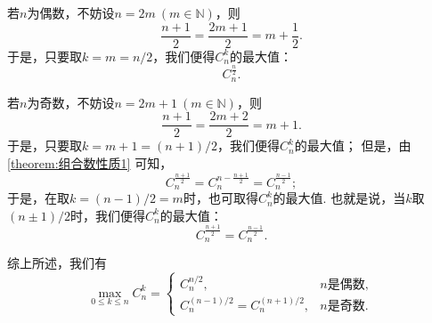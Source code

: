 \begin{example}
\begin{solution}
若\(n\)为偶数，不妨设\(n = 2m\ (m\in\mathbb{N})\)，则\begin{equation*}
	\frac{n+1}{2} = \frac{2m+1}{2}
	= m+\frac{1}{2}.
\end{equation*}
于是，只要取\(k = m = n/2\)，我们便得\(C_n^k\)的最大值：\begin{equation*}
	C_n^{\frac{n}{2}}.
\end{equation*}

若\(n\)为奇数，不妨设\(n = 2m+1\ (m\in\mathbb{N})\)，则\begin{equation*}
	\frac{n+1}{2} = \frac{2m+2}{2} = m+1.
\end{equation*}
于是，只要取\(k = m+1 = (n+1)/2\)，我们便得\(C_n^k\)的最大值；
但是，由\cref{theorem:组合数性质1} 可知，\begin{equation*}
	C_n^{\frac{n+1}{2}}
	= C_n^{n-\frac{n+1}{2}}
	= C_n^{\frac{n-1}{2}};
\end{equation*}
于是，在取\(k = (n-1)/2 = m\)时，也可取得\(C_n^k\)的最大值.
也就是说，当\(k\)取\((n\pm1)/2\)时，我们便得\(C_n^k\)的最大值：\begin{equation*}
	C_n^{\frac{n+1}{2}}
	= C_n^{\frac{n-1}{2}}.
\end{equation*}

综上所述，我们有\begin{equation}
	\max_{0 \leq k \leq n} C_n^k = \left\{ \begin{array}{cl}
		C_n^{n/2}, & \text{$n$是偶数}, \\
		C_n^{(n-1)/2} = C_n^{(n+1)/2}, & \text{$n$是奇数}.
	\end{array} \right.
\end{equation}
\end{solution}
\end{example}
